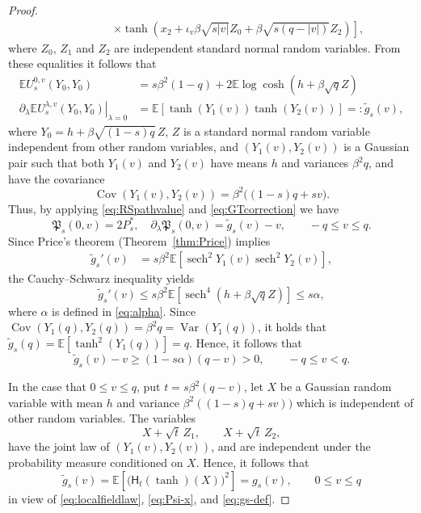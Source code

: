 \documentclass[11pt]{article}
\numberwithin{equation}{section}
\newcommand{\E}{\mathbb{E}}
\newcommand{\1}{\mathbf 1}
\newcommand{\sech}{\operatorname{sech}}
\newcommand{\Cov}{\operatorname{Cov}}
\begin{document}
\begin{proof}
\begin{align}
&\qquad \qquad \left. \times \tanh (x_2 + \iota _v \beta \sqrt{s|v|}Z_0 + \beta \sqrt{s(q-|v|)}Z_2 )\right],
\end{align}
where $Z_0$, $Z_1$ and $Z_2$ are independent standard normal random variables. 
From these equalities it follows that
\begin{align*}
\E U_s^{0,v}(Y_0,Y_0) &= s\beta^2(1-q) + 2 \E \log\cosh (h + \beta \sqrt{q} Z ) \\
%
\left.\partial_\lambda \E U_s^{\lambda ,v}(Y_0,Y_0) \right|_{\lambda=0} &=\E \left[ \tanh (Y_1(v)) \tanh (Y_2(v) )\right]=:\tilde{g}_s(v),
\end{align*}
where $Y_0 = h +\beta \sqrt{(1-s)q}\,Z$, $Z$ is a standard normal random variable independent from other random variables, and $(Y_1(v),Y_2(v))$ is a  Gaussian pair such that both $Y_1(v)$ and $Y_2(v)$ have means $h$ and variances $\beta^2q$, and have the covariance
\[
 \Cov(Y_1(v),Y_2(v)) =\beta^2\bigl((1-s)q+sv\bigr).
\]
Thus, by applying \eqref{eq:RSpathvalue} and \eqref{eq:GTcorrection}  we have 
\begin{equation}
 \mathfrak P_s(0,v)=2P_s^*,
 \quad
 \partial_\lambda\mathfrak P_s(0,v)= \tilde{g}_s(v)-v , \qquad -q\le v\le q.
 \label{eq:GT-zero-signed-simple}
\end{equation}
Since Price's theorem (Theorem~\ref{thm:Price}) implies
\begin{align*}
\tilde{g}_s'(v) &= s\beta ^2 \E[\sech ^2 Y_1(v)\sech ^2 Y_2(v)],
\end{align*}
the Cauchy--Schwarz inequality yields
\[
 \tilde{g}_s'(v) \le s\beta ^2 \E[\sech ^4 (h+\beta\sqrt{q}Z)]\le s\alpha,
\]
where $\alpha$ is defined in \eqref{eq:alpha}.
Since $\Cov(Y_1(q),Y_2(q)) = \beta ^2 q = \operatorname{Var} (Y_1(q))$, it holds that $\tilde{g}_s (q) = \E[\tanh ^2 (Y_1(q))] =q$.
Hence, it follows that
\begin{equation}
\tilde{g}_s(v) -v
 \ge(1-s\alpha)(q-v)>0,
 \qquad -q\le v<q.
 \label{eq:GT-signed-positive-simple}
\end{equation}

In the case that $0\le v\le q$, put $t=s\beta^2(q-v)$, let
$X$ be a Gaussian random variable with mean $h$ and variance $\beta^2((1-s)q+sv))$ which is independent of other random variables.  
The variables
\[
 X+\sqrt t\,Z_1,
 \qquad X+\sqrt t\,Z_2,
\]
have the joint law of $(Y_1(v),Y_2(v))$, and are independent under the probability measure conditioned on $X$.
Hence, it follows that
\begin{equation}\label{eq:gv(0<v<q)}
 \tilde{g}_s(v) =\E\left[
 \bigl(\mathsf H_t(\tanh)(X)\bigr)^2
 \right]=g_s(v), \qquad 0\le v \le q
\end{equation}
in view of \eqref{eq:localfieldlaw}, \eqref{eq:Psi-x}, and \eqref{eq:gs-def}.


\end{proof}
\end{document}
